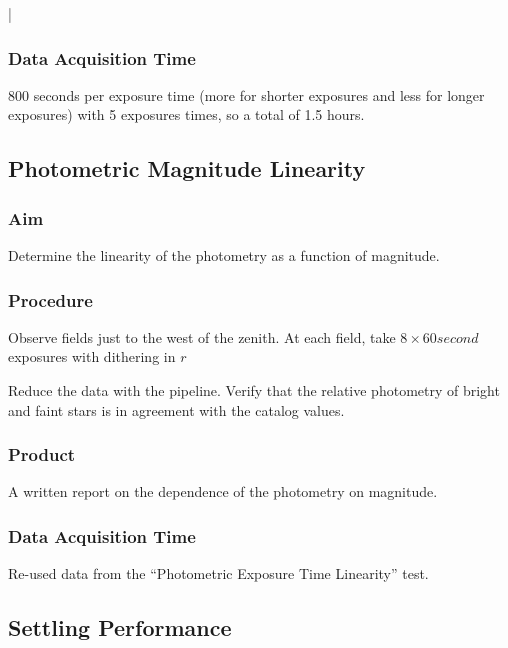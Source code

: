 |\documentclass{article}
\begin{document}
\subsubsection{Data Acquisition Time}

800 seconds per exposure time (more for shorter exposures and less for longer exposures) with 5 exposures times, so a total of 1.5 hours.


\subsection{Photometric Magnitude Linearity}

\subsubsection{Aim}

Determine the linearity of the photometry as a function of magnitude.

\subsubsection{Procedure}

Observe fields just to the west of the zenith. At each field, take $8 \times 60 second$ exposures with dithering in $r$

Reduce the data with the pipeline. Verify that the relative photometry of bright and faint stars is in agreement with the catalog values.

\subsubsection{Product}

A written report on the dependence of the photometry on magnitude.

\subsubsection{Data Acquisition Time}

Re-used data from the “Photometric Exposure Time Linearity” test.


\subsection{Settling Performance}
\end{document}
